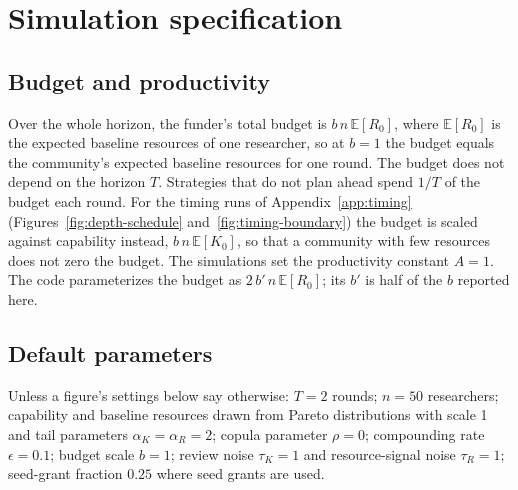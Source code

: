 \section{Simulation specification}\label{app:simulation}

\subsection*{Budget and productivity}
Over the whole horizon, the funder's total budget is $b\,n\,\mathbb{E}[R_{0}]$, where $\mathbb{E}[R_0]$ is the expected baseline resources of one researcher, so at $b = 1$ the budget equals the community's expected baseline resources for one round. The budget does not depend on the horizon $T$. Strategies that do not plan ahead spend $1/T$ of the budget each round. For the timing runs of Appendix~\ref{app:timing} (Figures~\ref{fig:depth-schedule} and~\ref{fig:timing-boundary}) the budget is scaled against capability instead, $b\,n\,\mathbb{E}[K_0]$, so that a community with few resources does not zero the budget. The simulations set the productivity constant $A = 1$. The code parameterizes the budget as $2\,b'\,n\,\mathbb{E}[R_0]$; its $b'$ is half of the $b$ reported here.

\subsection*{Default parameters}
Unless a figure's settings below say otherwise: $T = 2$ rounds; $n = 50$ researchers; capability and baseline resources drawn from Pareto distributions with scale 1 and tail parameters $\alpha_K = \alpha_R = 2$; copula parameter $\rho = 0$; compounding rate $\epsilon = 0.1$; budget scale $b = 1$; review noise $\tau_K = 1$ and resource-signal noise $\tau_R = 1$; seed-grant fraction $0.25$ where seed grants are used.

